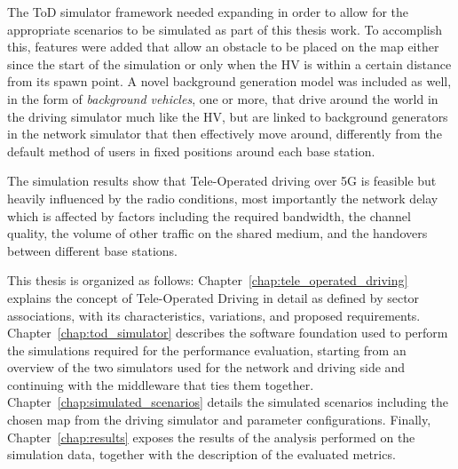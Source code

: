 The ToD simulator framework needed expanding in order to allow for the appropriate scenarios to be simulated as part of this thesis work. To accomplish this, features were added that allow an obstacle to be placed on the map either since the start of the simulation or only when the HV is within a certain distance from its spawn point. A novel background generation model was included as well, in the form of \textit{background vehicles}, one or more, that drive around the world in the driving simulator much like the HV, but are linked to background generators in the network simulator that then effectively move around, differently from the default method of users in fixed positions around each base station.

The simulation results show that Tele-Operated driving over 5G is feasible but heavily influenced by the radio conditions, most importantly the network delay which is affected by factors including the required bandwidth, the channel quality, the volume of other traffic on the shared medium, and the handovers between different base stations.

This thesis is organized as follows:
Chapter~\ref{chap:tele_operated_driving} explains the concept of Tele-Operated Driving in detail as defined by sector associations, with its characteristics, variations, and proposed requirements. Chapter~\ref{chap:tod_simulator} describes the software foundation used to perform the simulations required for the performance evaluation, starting from an overview of the two simulators used for the network and driving side and continuing with the middleware that ties them together. Chapter~\ref{chap:simulated_scenarios} details the simulated scenarios including the chosen map from the driving simulator and parameter configurations. Finally, Chapter~\ref{chap:results} exposes the results of the analysis performed on the simulation data, together with the description of the evaluated metrics.
